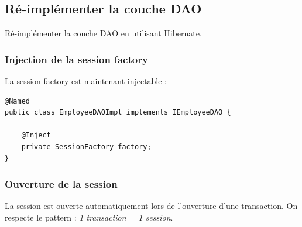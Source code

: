 \documentclass[small,algo]{dushClass}
\begin{document}
\subsection{Ré-implémenter la couche DAO}

Ré-implémenter la couche DAO en utilisant Hibernate.



\subsubsection{Injection de la session factory}

La session factory est maintenant injectable :
\begin{lstlisting}
@Named
public class EmployeeDAOImpl implements IEmployeeDAO {
	
	@Inject
	private SessionFactory factory;
}
\end{lstlisting}


\subsubsection{Ouverture de la session}
La session est ouverte automatiquement lors de l'ouverture d'une transaction. On respecte le pattern : \emph{1 transaction = 1 session}.\\

\end{document}

